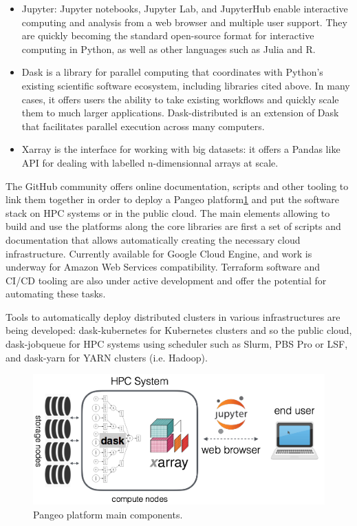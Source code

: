 \documentclass{article}
\begin{document}
\begin{itemize}
\item Jupyter: Jupyter notebooks, Jupyter Lab, and JupyterHub enable interactive computing and analysis from a web browser and multiple user support. They are quickly becoming the standard open-source format for interactive computing in Python, as well as other languages such as Julia and R.
\item Dask is a library for parallel computing that coordinates with Python’s existing scientific software ecosystem, including libraries cited above. In many cases, it offers users the ability to take existing workflows and quickly scale them to much larger applications. Dask-distributed is an extension of Dask that facilitates parallel execution across many computers.
\item Xarray is the interface for working with big datasets: it offers a Pandas like API for dealing with labelled n-dimensionnal arrays at scale.
\end{itemize}

The GitHub community offers online documentation, scripts and other tooling to link them together in order to deploy a Pangeo platform\ref{pangeo_stack} and put the software stack on HPC systems or in the public cloud. The main elements allowing to build and use the platforms along the core libraries are first a set of scripts and documentation that allows automatically creating the necessary cloud infrastructure. Currently available for Google Cloud Engine, and work is underway for Amazon Web Services compatibility. Terraform software and CI/CD tooling are also under active development and offer the potential for automating these tasks.

Tools to automatically deploy distributed clusters in various infrastructures are being developed: dask-kubernetes for Kubernetes clusters and so the public cloud, dask-jobqueue\cite{b4} for HPC systems using scheduler such as Slurm, PBS Pro or LSF, and dask-yarn for YARN clusters (i.e. Hadoop).

\begin{figure}
  \centering
  \includegraphics[width=\columnwidth]{pangeo_stack.png}
  \caption{\label{pangeo_stack} Pangeo platform main components.}
\end{figure}
\end{document}
